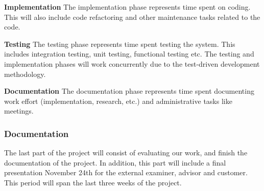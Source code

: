 \textbf{Implementation} The implementation phase represents time spent on coding.
This will also include code refactoring and other maintenance tasks
related to the code.

\textbf{Testing} The testing phase represents time spent testing the system.
This includes integration testing, unit testing, functional testing etc.
The testing and implementation phases will work concurrently due to the
test-driven development methodology.

\textbf{Documentation} The documentation phase represents time spent
documenting work effort (implementation, research, etc.) and administrative
tasks like meetings.

\subsubsection{Documentation}
The last part of the project will consist of evaluating our work, and finish the documentation of the project. In addition, this part will include a final presentation November 24th for the external examiner, advisor and customer. This period will span the last three weeks of the project.  
